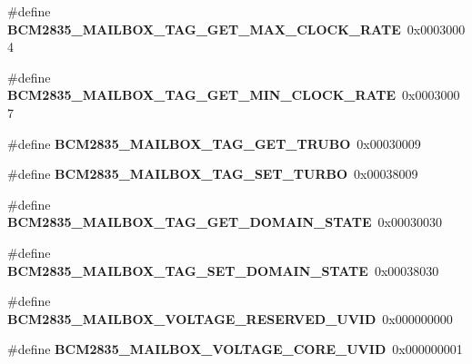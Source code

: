 \begin{DoxyCompactItemize}
\#define {\bfseries B\+C\+M2835\+\_\+\+M\+A\+I\+L\+B\+O\+X\+\_\+\+T\+A\+G\+\_\+\+G\+E\+T\+\_\+\+M\+A\+X\+\_\+\+C\+L\+O\+C\+K\+\_\+\+R\+A\+TE}~0x00030004
\item 
\mbox{\label{group__raspberrypi__vc_ga5881655364516720bd19ce63c5c3b078}} 
\#define {\bfseries B\+C\+M2835\+\_\+\+M\+A\+I\+L\+B\+O\+X\+\_\+\+T\+A\+G\+\_\+\+G\+E\+T\+\_\+\+M\+I\+N\+\_\+\+C\+L\+O\+C\+K\+\_\+\+R\+A\+TE}~0x00030007
\item 
\mbox{\label{group__raspberrypi__vc_ga38caf0ef18de78e062c3147459918ae7}} 
\#define {\bfseries B\+C\+M2835\+\_\+\+M\+A\+I\+L\+B\+O\+X\+\_\+\+T\+A\+G\+\_\+\+G\+E\+T\+\_\+\+T\+R\+U\+BO}~0x00030009
\item 
\mbox{\label{group__raspberrypi__vc_gaad0d0d716c62b5b803324d2016084017}} 
\#define {\bfseries B\+C\+M2835\+\_\+\+M\+A\+I\+L\+B\+O\+X\+\_\+\+T\+A\+G\+\_\+\+S\+E\+T\+\_\+\+T\+U\+R\+BO}~0x00038009
\item 
\mbox{\label{group__raspberrypi__vc_gaca7694f6a0198d7f3c0aa13542442ac1}} 
\#define {\bfseries B\+C\+M2835\+\_\+\+M\+A\+I\+L\+B\+O\+X\+\_\+\+T\+A\+G\+\_\+\+G\+E\+T\+\_\+\+D\+O\+M\+A\+I\+N\+\_\+\+S\+T\+A\+TE}~0x00030030
\item 
\mbox{\label{group__raspberrypi__vc_gafa41e4bc0aa6ba0832f7ab772fc7543d}} 
\#define {\bfseries B\+C\+M2835\+\_\+\+M\+A\+I\+L\+B\+O\+X\+\_\+\+T\+A\+G\+\_\+\+S\+E\+T\+\_\+\+D\+O\+M\+A\+I\+N\+\_\+\+S\+T\+A\+TE}~0x00038030
\item 
\mbox{\label{group__raspberrypi__vc_ga1c51ddcecf355b9d3772ab5257bd82ac}} 
\#define {\bfseries B\+C\+M2835\+\_\+\+M\+A\+I\+L\+B\+O\+X\+\_\+\+V\+O\+L\+T\+A\+G\+E\+\_\+\+R\+E\+S\+E\+R\+V\+E\+D\+\_\+\+U\+V\+ID}~0x000000000
\item 
\mbox{\label{group__raspberrypi__vc_ga8de66aa6c91ac7e8838fa06173838879}} 
\#define {\bfseries B\+C\+M2835\+\_\+\+M\+A\+I\+L\+B\+O\+X\+\_\+\+V\+O\+L\+T\+A\+G\+E\+\_\+\+C\+O\+R\+E\+\_\+\+U\+V\+ID}~0x000000001
\item 
\mbox{\label{group__raspberrypi__vc_gac32837c29f3453bfa37702f7a85ecdb1}} 

\end{DoxyCompactItemize}
